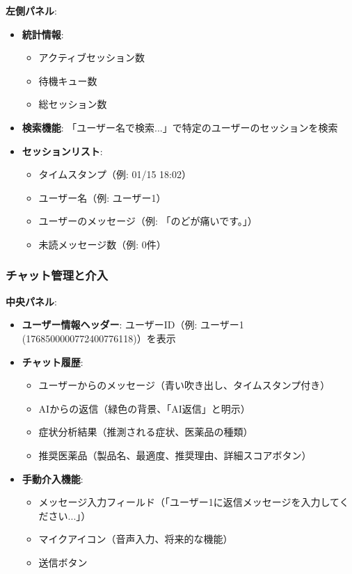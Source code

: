 \documentclass[a4paper,11pt,ja=standard,xelatex]{bxjsarticle}
\theoremstyle{definition}
\begin{document}
\textbf{左側パネル}:
\begin{itemize}
\item \textbf{統計情報}: 
  \begin{itemize}
  \item アクティブセッション数
  \item 待機キュー数
  \item 総セッション数
  \end{itemize}
\item \textbf{検索機能}: 「ユーザー名で検索...」で特定のユーザーのセッションを検索
\item \textbf{セッションリスト}: 
  \begin{itemize}
  \item タイムスタンプ（例: 01/15 18:02）
  \item ユーザー名（例: ユーザー1）
  \item ユーザーのメッセージ（例: 「のどが痛いです。」）
  \item 未読メッセージ数（例: 0件）
  \end{itemize}
\end{itemize}

\subsubsection{チャット管理と介入}

\textbf{中央パネル}:
\begin{itemize}
\item \textbf{ユーザー情報ヘッダー}: ユーザーID（例: ユーザー1 (1768500000772400776118)）を表示
\item \textbf{チャット履歴}: 
  \begin{itemize}
  \item ユーザーからのメッセージ（青い吹き出し、タイムスタンプ付き）
  \item AIからの返信（緑色の背景、「AI返信」と明示）
  \item 症状分析結果（推測される症状、医薬品の種類）
  \item 推奨医薬品（製品名、最適度、推奨理由、詳細スコアボタン）
  \end{itemize}
\item \textbf{手動介入機能}: 
  \begin{itemize}
  \item メッセージ入力フィールド（「ユーザー1に返信メッセージを入力してください...」）
  \item マイクアイコン（音声入力、将来的な機能）
  \item 送信ボタン
  \end{itemize}
\end{itemize}
\end{document}
